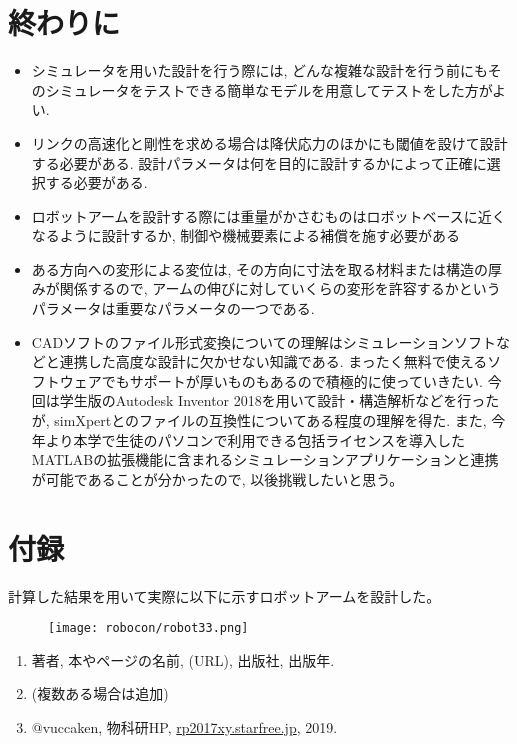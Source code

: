 \documentclass[10pt,b5paper,papersize,dvipdfmx]{jsbook}
\begin{document}
\section{終わりに}
\begin{itemize}
\item シミュレータを用いた設計を行う際には, どんな複雑な設計を行う前にもそのシミュレータをテストできる簡単なモデルを用意してテストをした方がよい.
\item リンクの高速化と剛性を求める場合は降伏応力のほかにも閾値を設けて設計する必要がある. 設計パラメータは何を目的に設計するかによって正確に選択する必要がある. 
\item ロボットアームを設計する際には重量がかさむものはロボットベースに近くなるように設計するか, 制御や機械要素による補償を施す必要がある
\item ある方向への変形による変位は, その方向に寸法を取る材料または構造の厚みが関係するので, アームの伸びに対していくらの変形を許容するかというパラメータは重要なパラメータの一つである.
\item CADソフトのファイル形式変換についての理解はシミュレーションソフトなどと連携した高度な設計に欠かせない知識である. まったく無料で使えるソフトウェアでもサポートが厚いものもあるので積極的に使っていきたい. 今回は学生版のAutodesk Inventor 2018を用いて設計・構造解析などを行ったが, simXpertとのファイルの互換性についてある程度の理解を得た. また, 今年より本学で生徒のパソコンで利用できる包括ライセンスを導入したMATLABの拡張機能に含まれるシミュレーションアプリケーションと連携が可能であることが分かったので, 以後挑戦したいと思う。
\end{itemize}

\section{付録}
計算した結果を用いて実際に以下に示すロボットアームを設計した。
\begin{figure}[H]
  \centering
  \texttt{[image: robocon/robot33.png]}
\end{figure}

\begin{sanko}
  \begin{enumerate}
    \item 著者, 本やページの名前, (URL), 出版社, 出版年.
    \item (複数ある場合は追加)
    \item @vuccaken, 物科研HP, \url{rp2017xy.starfree.jp}, 2019.
  \end{enumerate}
\end{sanko}
\end{document}
